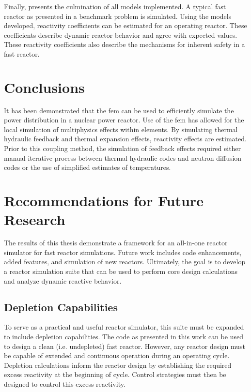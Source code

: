   Finally,  presents the culmination of all models
  implemented. A typical fast reactor as presented in a benchmark problem is 
  simulated.  Using the models developed, reactivity coefficients can be 
  estimated for an operating reactor. These coefficients describe dynamic 
  reactor behavior and agree with expected values. These reactivity coefficients 
  also describe the mechanisms for inherent safety in a fast reactor.

\section{Conclusions}
  
  It has been demonstrated that the \gls{fem} can be used to efficiently 
  simulate the power distribution in a nuclear power reactor. Use of the
  \gls{fem} has allowed for the local simulation of multiphysics effects within 
  elements. By simulating thermal hydraulic feedback and thermal expansion 
  effects, reactivity effects are estimated. Prior to this coupling method, the 
  simulation of feedback effects required either manual iterative process 
  between thermal hydraulic codes and neutron diffusion codes or the use of 
  simplified estimates of temperatures. 
  
\section{Recommendations for Future Research}

  The results of this thesis demonstrate a framework for an all-in-one reactor 
  simulator for fast reactor simulations. Future work includes code 
  enhancements, added features, and simulation of new reactors. Ultimately, the 
  goal is to develop a reactor simulation suite that can be used to perform core 
  design calculations and analyze dynamic reactive behavior.

  \subsection{Depletion Capabilities}
    To serve as a practical and useful reactor simulator, this suite must be
    expanded to include depletion capabilities. The code as presented in this
    work can be used to design a clean (i.e. undepleted) fast reactor. However,
    any reactor design must be capable of extended and continuous operation
    during an operating cycle. Depletion calculations inform the reactor design
    by establishing the required excess reactivity at the beginning of cycle.
    Control strategies must then be designed to control this excess reactivity. 

